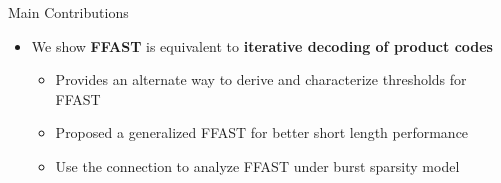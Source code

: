 \documentclass[10pt,xcolor=table]{beamer}
\begin{document}
\begin{frame}
\begin{block}{Main Contributions}
	\begin{itemize}
		\item We show \alert{\textbf{FFAST}} is equivalent to \alert{\textbf{iterative decoding of product codes}}
		\begin{itemize}
			\item Provides an alternate way to derive and characterize thresholds for FFAST
			\item Proposed a generalized FFAST for better short length performance
			\item Use the connection to analyze FFAST under burst sparsity model
		\end{itemize}
	\end{itemize}
\end{block}
\end{frame}

%

%
\end{document}
